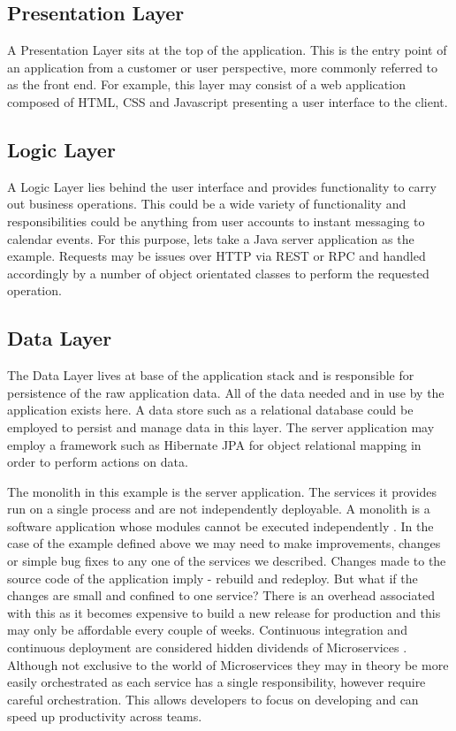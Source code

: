 \documentclass[journal]{IEEEtran}
\begin{document}
\subsection{Presentation Layer}
A Presentation Layer sits at the top of the application. This is the entry point of an application from a customer or user perspective, more commonly referred to as the front end. For example, this layer may consist of a web application composed of HTML, CSS and Javascript presenting a user interface to the client. 

\subsection{Logic Layer}
A Logic Layer lies behind the user interface and provides functionality to carry out business operations. This could be a wide variety of functionality and responsibilities could be anything from user accounts to instant messaging to calendar events. For this purpose, lets take a Java server application as the example. Requests may be issues over HTTP via REST\cite{Fielding:2000:ASD:932295} or RPC and handled accordingly by a number of object orientated classes to perform the requested operation.

\subsection{Data Layer}
The Data Layer lives at base of the application stack and is responsible for persistence of the raw application data. All of the data needed and in use by the application exists here. A data store such as a relational database could be employed to persist and manage data in this layer. The server application may employ a framework such as Hibernate\cite{JPAHibernate} JPA for object relational mapping in order to perform actions on data. 

The monolith in this example is the server application. The services it provides run on a single process and are not independently deployable. A monolith is a software application whose modules cannot be executed independently \cite{MicroservicesYesterdayTodayTomorrow}. In the case of the example defined above we may need to make improvements, changes or simple bug fixes to any one of the services we described. Changes made to the source code of the application imply - rebuild and redeploy. But what if the changes are small and confined to one service? There is an overhead associated with this as it becomes expensive to build a new release for production and this may only be affordable every couple of weeks. Continuous integration and continuous deployment are considered hidden dividends of Microservices \cite{hiddendividends}. Although not exclusive to the world of Microservices they may in theory be more easily orchestrated as each service has a single responsibility, however require careful orchestration. This allows developers to focus on developing and can speed up productivity across teams. 
\end{document}
